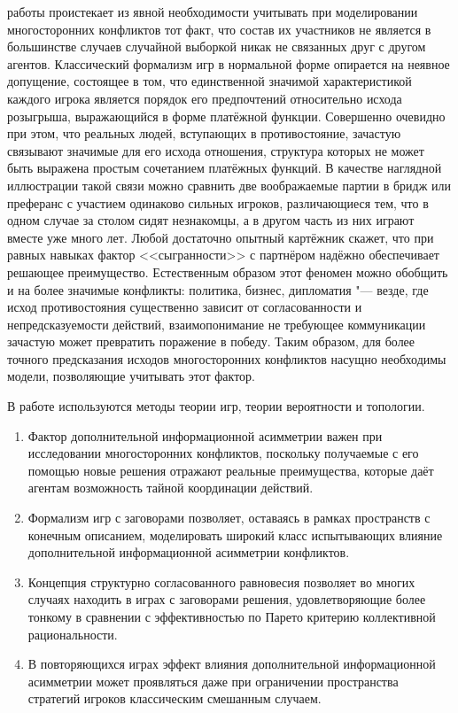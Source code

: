 {\influence} работы проистекает из явной необходимости учитывать при моделировании многосторонних конфликтов тот факт, что состав их участников не является в большинстве случаев случайной выборкой никак не связанных друг с другом агентов. Классический формализм игр в нормальной форме опирается на неявное допущение, состоящее в том, что единственной значимой характеристикой каждого игрока является порядок его предпочтений относительно исхода розыгрыша, выражающийся в форме платёжной функции. Совершенно очевидно при этом, что реальных людей, вступающих в противостояние, зачастую связывают значимые для его исхода отношения, структура которых не может быть выражена простым сочетанием платёжных функций. В качестве наглядной иллюстрации такой связи можно сравнить две воображаемые партии в бридж или преферанс с участием одинаково сильных игроков, различающиеся тем, что в одном случае за столом сидят незнакомцы, а в другом часть из них играют вместе уже много лет. Любой достаточно опытный картёжник скажет, что при равных навыках фактор <<сыгранности>> с партнёром надёжно обеспечивает решающее преимущество. Естественным образом этот феномен можно обобщить и на более значимые конфликты: политика, бизнес, дипломатия "--- везде, где исход противостояния существенно зависит от согласованности и непредсказуемости действий, взаимопонимание не требующее коммуникации зачастую может превратить поражение в победу. Таким образом, для более точного предсказания исходов многосторонних конфликтов насущно необходимы модели, позволяющие учитывать этот фактор.

{\methods} В работе используются методы теории игр, теории вероятности и топологии.

{}
\begin{enumerate}[beginpenalty=10000] %
  \item Фактор дополнительной информационной асимметрии важен при исследовании многосторонних конфликтов, поскольку получаемые с его помощью новые решения отражают реальные преимущества, которые даёт агентам возможность тайной координации действий.
  \item Формализм игр с заговорами позволяет, оставаясь в рамках пространств с конечным описанием, моделировать широкий класс испытывающих влияние дополнительной информационной асимметрии конфликтов.
  \item Концепция структурно согласованного равновесия позволяет во многих случаях находить в играх с заговорами решения, удовлетворяющие более тонкому в сравнении с эффективностью по Парето критерию коллективной рациональности.
  \item В повторяющихся играх эффект влияния дополнительной информационной асимметрии может проявляться даже при ограничении пространства стратегий игроков классическим смешанным случаем.
\end{enumerate}

